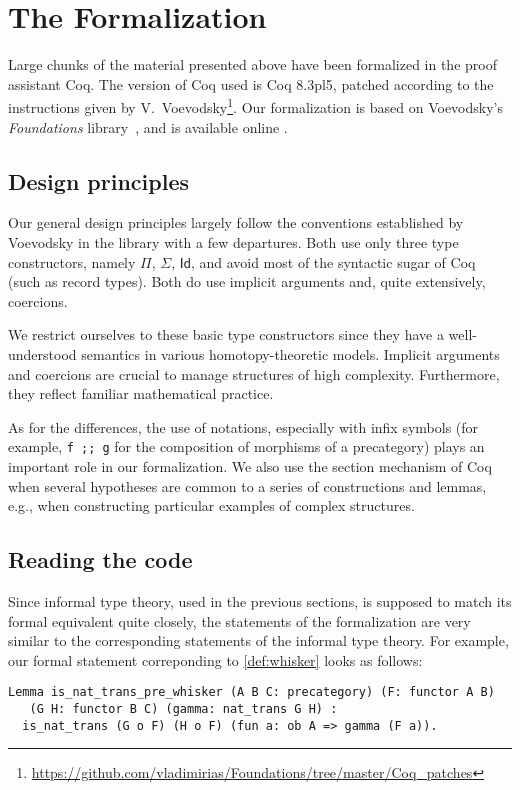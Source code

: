 
\section{The Formalization}
\label{sec:formalization}


Large chunks of the material presented above have been formalized in the proof assistant \textsf{Coq}.
The version of \textsf{Coq} used is \textsf{Coq} 8.3pl5, patched according to the instructions given by
V.\ Voevodsky\footnote{\url{https://github.com/vladimirias/Foundations/tree/master/Coq_patches}}.
Our formalization is based on Voevodsky's \emph{Foundations} library~\cite{vv_foundations},
and is available online \cite{rezk_coq}.


\subsection*{Design principles}
Our general design principles largely follow the conventions established by Voevodsky in the library \cite{vv_foundations} 
with a few departures. 
Both use only three type constructors, namely $\Pi$, $\Sigma$, $\textsf{Id}$, and avoid most of the syntactic sugar of \textsf{Coq} (such as record types).
Both do use implicit arguments and, quite extensively, coercions.

We restrict ourselves to these basic type constructors since they have a well-understood
semantics in various homotopy-theoretic models. Implicit arguments and coercions are 
crucial to manage structures of high complexity. Furthermore, they reflect
 familiar mathematical practice.


As for the differences, the use of notations, especially with infix symbols (for example, \lstinline!f ;; g! for 
the composition of morphisms of a precategory) plays an important role in our formalization. 
We also use the section mechanism of \textsf{Coq} 
when several hypotheses are common to a series of constructions and lemmas, e.g., 
when constructing particular examples of complex structures.

\subsection*{Reading the code}

Since informal type theory, used in the previous sections, is supposed to match its formal equivalent quite closely, 
the statements of the formalization are very similar to the corresponding statements of the informal type theory. 
For example, our formal statement correponding to \autoref{def:whisker} looks as follows:
\begin{lstlisting}
Lemma is_nat_trans_pre_whisker (A B C: precategory) (F: functor A B)
   (G H: functor B C) (gamma: nat_trans G H) :
  is_nat_trans (G o F) (H o F) (fun a: ob A => gamma (F a)).
\end{lstlisting}


